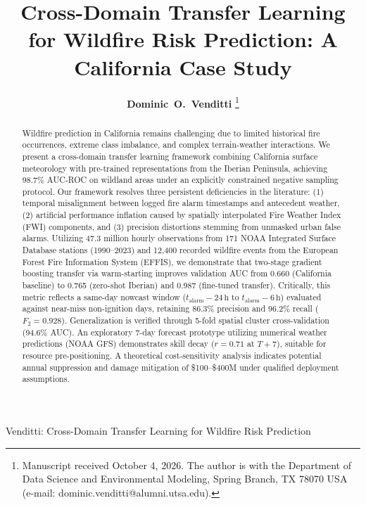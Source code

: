 \documentclass[journal]{IEEEtran}
\begin{document}
\title{\color{Burgundy}\huge\textbf{Cross-Domain Transfer Learning for Wildfire Risk Prediction: A California Case Study}}

\author{\textbf{\color{Maroon}Dominic~O.~Venditti}%
\thanks{Manuscript received October 4, 2026. The author is with the Department of Data Science and Environmental Modeling, Spring Branch, TX 78070 USA (e-mail: dominic.venditti@alumni.utsa.edu).}}

%
{\textcolor{Burgundy}{Venditti}: Cross-Domain Transfer Learning for Wildfire Risk Prediction}

\maketitle

\begin{abstract}
Wildfire prediction in California remains challenging due to limited historical fire occurrences, extreme class imbalance, and complex terrain-weather interactions. We present a cross-domain transfer learning framework combining California surface meteorology with pre-trained representations from the Iberian Peninsula, achieving 98.7\% AUC-ROC on wildland areas under an explicitly constrained negative sampling protocol. Our framework resolves three persistent deficiencies in the literature: (1) temporal misalignment between logged fire alarm timestamps and antecedent weather, (2) artificial performance inflation caused by spatially interpolated Fire Weather Index (FWI) components, and (3) precision distortions stemming from unmasked urban false alarms. Utilizing 47.3 million hourly observations from 171 NOAA Integrated Surface Database stations (1990--2023) and 12,400 recorded wildfire events from the European Forest Fire Information System (EFFIS), we demonstrate that two-stage gradient boosting transfer via warm-starting improves validation AUC from 0.660 (California baseline) to 0.765 (zero-shot Iberian) and 0.987 (fine-tuned transfer). Critically, this metric reflects a same-day nowcast window ($t_{\text{alarm}} - 24\,\text{h}$ to $t_{\text{alarm}} - 6\,\text{h}$) evaluated against near-miss non-ignition days, retaining 86.3\% precision and 96.2\% recall ($F_2=0.928$). Generalization is verified through 5-fold spatial cluster cross-validation (94.6\% AUC). An exploratory 7-day forecast prototype utilizing numerical weather predictions (NOAA GFS) demonstrates skill decay ($r=0.71$ at $T+7$), suitable for resource pre-positioning. A theoretical cost-sensitivity analysis indicates potential annual suppression and damage mitigation of \$100--\$400M under qualified deployment assumptions.
\end{abstract}
\end{document}
